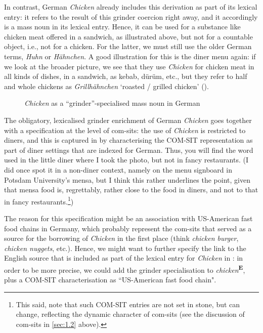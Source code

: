 In contrast, German \textit{Chicken} already includes this derivation as part of its lexical entry: it refers to the result of this grinder coercion right away, and it accordingly is a mass noun in its lexical entry. Hence, it can be used for a substance like chicken meat offered in a sandwich, as illustrated above, but not for a countable object, i.e., not for a chicken. For the latter, we must still use the older German terms, \textit{Huhn} or \textit{Hähnchen}. A good illustration for this is the diner menu again: if we look at the broader picture, we see that they use \textit{Chicken} for chicken meat in all kinds of dishes, in a sandwich, as kebab, dürüm, etc., but they refer to half and whole chickens as \textit{Grillhähnchen} ‘roasted / grilled chicken’ ().

\begin{figure}[H]
\caption{\textit{Chicken} as a ``grinder''-specialised mass noun in German}
\label{fig:8}
\end{figure}

The obligatory, lexicalised grinder enrichment of German \textit{Chicken} goes together with a specification at the level of com-sits: the use of \textit{Chicken} is restricted to diners, and this is captured in  by characterising the COM-SIT representation as part of diner settings that are indexed for German. Thus, you will find the word used in the little diner where I took the photo, but not in fancy restaurants. (I did once spot it in a non-diner context, namely on the menu signboard in Potsdam University’s mensa, but I think this rather underlines the point, given that mensa food is, regrettably, rather close to the food in diners, and not to that in fancy restaurants.\footnote{This said, note that such COM-SIT entries are not set in stone, but can change, reflecting the dynamic character of com-sits (see the discussion of com-sits in \ref{sec:1.2} above).})

The reason for this specification might be an association with US-American fast food chains in Germany, which probably represent the com-sits that served as a source for the borrowing of \textit{Chicken} in the first place (think \textit{chicken burger}, \textit{chicken nuggets}, etc.). Hence, we might want to further specify the link to the English source that is included as part of the lexical entry for \textit{Chicken} in : in order to be more precise, we could add the grinder specialisation to \textit{chicken}\textbf{\textsuperscript{E}}, plus a COM-SIT characterisation as “US-American fast food chain".

